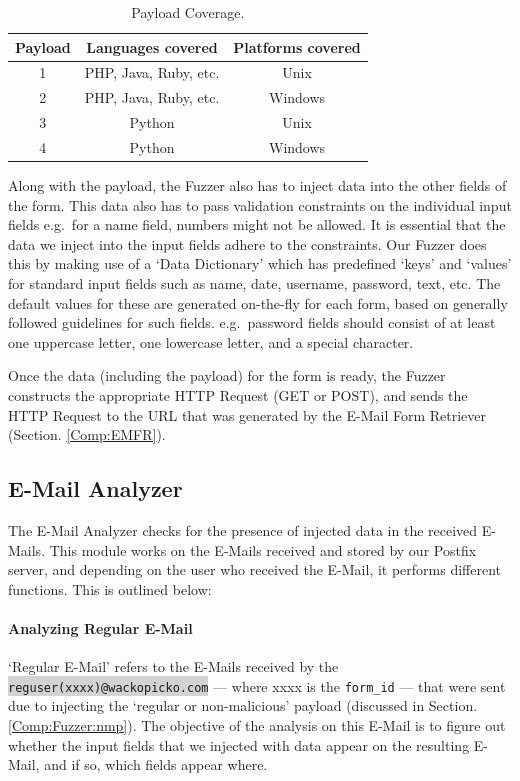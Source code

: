 \begin{table}[!htbp]
	\centering
	\begin{tabular}{|c|c|c|}
		\hline
		\multicolumn{1}{|c|}{\textbf{Payload}} & \multicolumn{1}{c}{\textbf{Languages covered}} & \multicolumn{1}{|c|}{\textbf{Platforms covered}}\\
		\hline
		1 & PHP, Java, Ruby, etc. & Unix\\
		\hline
		2 & PHP, Java, Ruby, etc. & Windows\\
		\hline
		3 & Python & Unix\\
		\hline
		4 & Python & Windows\\
		\hline
	\end{tabular}
	\caption{Payload Coverage.}
	\label{tab:payloadcov}
\end{table}
Along with the payload, the Fuzzer also has to inject data into the other fields of the form. This data also has to pass validation constraints on the individual input fields e.g.\ for a name field, numbers might not be allowed. It is essential that the data we inject into the input fields adhere to the constraints. Our Fuzzer does this by making use of a `Data Dictionary' which has predefined `keys' and `values' for standard input fields such as name, date, username, password, text, etc. The default values for these are generated on-the-fly for each form, based on generally followed guidelines for such fields. e.g.\ password fields should consist of at least one uppercase letter, one lowercase letter, and a special character.

Once the data (including the payload) for the form is ready, the Fuzzer constructs the appropriate HTTP Request (GET or POST), and sends the HTTP Request to the URL that was generated by the E-Mail Form Retriever (Section. \ref{Comp:EMFR}). 


\subsection{E-Mail Analyzer}
\label{Comp:EMA}
The E-Mail Analyzer checks for the presence of injected data in the received E-Mails. This module works on the E-Mails received and stored by our Postfix server, and depending on the user who received the E-Mail, it performs different functions. This is outlined below:
\paragraph{Analyzing Regular E-Mail}
`Regular E-Mail' refers to the E-Mails received by the \colorbox{lightgray}{\lstinline{reguser(xxxx)@wackopicko.com}} --- where xxxx is the \lstinline{form_id} --- that were sent due to injecting the `regular or non-malicious' payload (discussed in Section. \ref{Comp:Fuzzer:nmp}). The objective of the analysis on this E-Mail is to figure out whether the input fields that we injected with data appear on the resulting E-Mail, and if so, which fields appear where.

